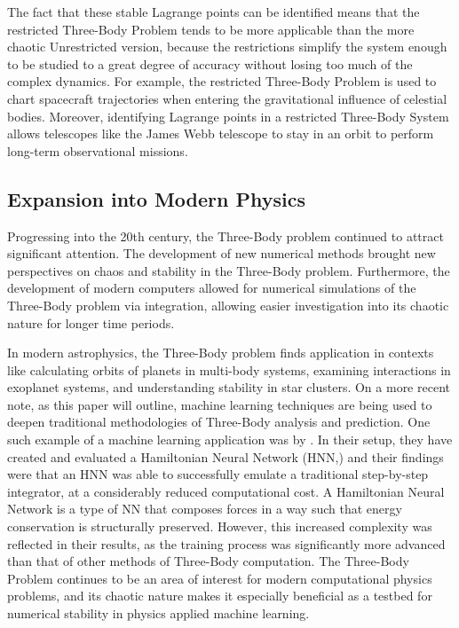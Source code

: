 \documentclass[12pt]{article}
\begin{document}
The fact that these stable Lagrange points can be identified means that the restricted Three-Body Problem tends to be more applicable than the more chaotic Unrestricted version, because the restrictions simplify the system enough to be studied to a great degree of accuracy without losing too much of the complex dynamics. For example, the restricted Three-Body Problem is used to chart spacecraft trajectories when entering the gravitational influence of celestial bodies. Moreover, identifying Lagrange points in a restricted Three-Body System allows telescopes like the James Webb telescope \citep{gardner2006james} to stay in an orbit to perform long-term observational missions.

\subsection{Expansion into Modern Physics}
\label{exp_phys}
Progressing into the 20th century, the Three-Body problem continued to attract significant attention. The development of new numerical methods brought new perspectives on chaos and stability in the Three-Body problem. Furthermore, the development of modern computers allowed for numerical simulations of the Three-Body problem via integration, allowing easier investigation into its chaotic nature for longer time periods.

In modern astrophysics, the Three-Body problem finds application in contexts like calculating orbits of planets in multi-body systems, examining interactions in exoplanet systems, and understanding stability in star clusters. On a more recent note, as this paper will outline, machine learning techniques are being used to deepen traditional methodologies of Three-Body analysis and prediction. One such example of a machine learning application was by \cite{ulibarrena2024hybrid}. In their setup, they have created and evaluated a Hamiltonian Neural Network (HNN,) and their findings were that an HNN was able to successfully emulate a traditional step-by-step integrator, at a considerably reduced computational cost. A Hamiltonian Neural Network is a type of NN that composes forces in a way such that energy conservation is structurally preserved. However, this increased complexity was reflected in their results, as the training process was significantly more advanced than that of other methods of Three-Body computation. The Three-Body Problem continues to be an area of interest for modern computational physics problems, and its chaotic nature makes it especially beneficial as a testbed for numerical stability in physics applied machine learning.
\end{document}
